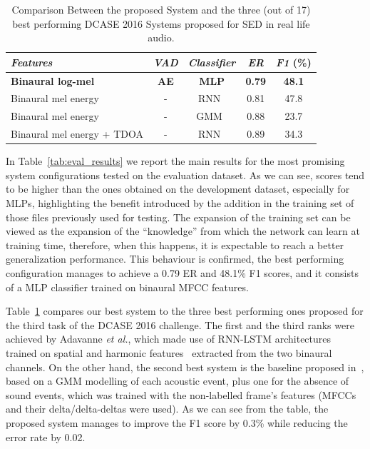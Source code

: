 \begin{table}
	\caption{Comparison Between the proposed System and the three (out of 17) best performing DCASE 2016 Systems proposed for SED in real life audio.}
	\label{tab:challenge_results}
	\centering
	\begin{tabular}{l c c c c}\toprule
		\emph{Features} & \emph{VAD} & \emph{Classifier} & \emph{ER} & \emph{F1} (\%)\\
		\midrule
		\textbf{Binaural log-mel} & \textbf{AE} & \textbf{MLP} & \textbf{0.79} & \textbf{48.1}\\
		\midrule
		Binaural mel energy & - & RNN~\cite{adavanne2016sound} & 0.81 & 47.8\\
		Binaural mel energy & - & GMM~\cite{mesaros2016tut} & 0.88 & 23.7\\
		Binaural mel energy + TDOA & - & RNN~\cite{adavanne2016sound} & 0.89 & 34.3\\
		\bottomrule
	\end{tabular}
\end{table}

In Table~\ref{tab:eval_results} we report the main results for the most promising system configurations tested on the evaluation dataset. As we can see, scores tend to be higher than the ones obtained on the development dataset, especially for MLPs, highlighting the benefit introduced by the addition in the training set of those files previously used for testing. The expansion of the training set can be viewed as the expansion of the ``knowledge'' from which the network can learn at training time, therefore, when this happens, it is expectable to reach a better generalization performance. This behaviour is confirmed, the best performing configuration manages to achieve a 0.79 ER and 48.1\% F1 scores, and it consists of a MLP classifier trained on binaural MFCC features.

Table~\ref{tab:challenge_results} compares our best system to the three best performing ones proposed for the third task of the DCASE 2016 challenge. The first and the third ranks were achieved by Adavanne \emph{et al.}, which made use of RNN-LSTM architectures trained on spatial and harmonic features~\cite{adavanne2016sound} extracted from the two binaural channels. On the other hand, the second best system is the baseline proposed in~\cite{mesaros2016tut}, based on a GMM modelling of each acoustic event, plus one for the absence of sound events, which was trained with the non-labelled frame's features (MFCCs and their delta/delta-deltas were used). As we can see from the table, the proposed system manages to improve the F1 score by 0.3\% while reducing the error rate by 0.02.

